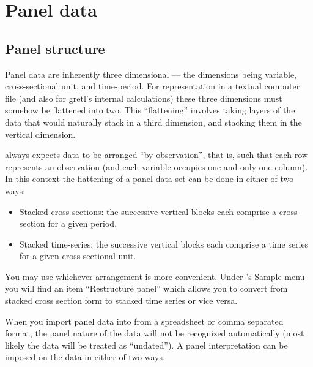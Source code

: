 \chapter{Panel data}
\label{chap-panel}

\section{Panel structure}
\label{panel-structure}

Panel data are inherently three dimensional --- the dimensions being
variable, cross-sectional unit, and time-period.  For representation
in a textual computer file (and also for gretl's internal
calculations) these three dimensions must somehow be flattened into
two.  This ``flattening'' involves taking layers of the data that
would naturally stack in a third dimension, and stacking them in the
vertical dimension.

 always expects data to be arranged ``by observation'',
that is, such that each row represents an observation (and each
variable occupies one and only one column).  In this context the
flattening of a panel data set can be done in either of two ways:

\begin{itemize}
\item Stacked cross-sections: the successive vertical blocks each
  comprise a cross-section for a given period.
\item Stacked time-series: the successive vertical blocks each
  comprise a time series for a given cross-sectional unit.
\end{itemize}

You may use whichever arrangement is more convenient. Under
's \textsf{Sample} menu you will find an item ``Restructure
panel'' which allows you to convert from stacked cross section form to
stacked time series or vice versa.

When you import panel data into  from a spreadsheet or
comma separated format, the panel nature of the data will not be
recognized automatically (most likely the data will be treated as
``undated'').  A panel interpretation can be imposed on the data in
either of two ways.

